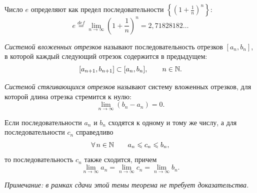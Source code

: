 \begin{definition}
Число \(e\) определяют как предел последовательности
\(\left\{\left(1 + \frac{1}{n}\right)^{n}\right\}\):
\[
e \overset{def}{=} \lim\limits_{n \to \infty}
\left(1 + \frac{1}{n}\right)^{n} = 2{,}71828182\ldots\]
\end{definition}


\begin{definition}
\textit{Системой вложенных отрезков} называют последовательность отрезков
\([a_{n}, b_{n}]\), в которой каждый следующий отрезок содержится в предыдущем:
\[
[a_{n+1}, b_{n+1}] \subset [a_{n}, b_{n}], \qquad n \in \mathbb{N}.
\]
\end{definition}

\begin{definition}
\textit{Системой стягивающихся отрезков} называют систему вложенных отрезков,
для которой длина отрезка стремится к нулю:
\[
\lim_{n\to\infty} (b_{n} - a_{n}) = 0.
\]
\end{definition}

\begin{theorem}
Если последовательности \(a_{n}\) и \(b_{n}\) сходятся к одному и тому же числу,
а для последовательности \(c_{n}\) справедливо
\[
\forall \, n \in \mathbb{N} \qquad a_{n} \leqslant c_{n} \leqslant b_{n},
\]
то последовательность \(c_{n}\) также сходится, причем
\[
\lim_{ n \to \infty } a_{n} = \lim_{ n \to \infty } c_{n} = \lim_{ n \to \infty } b_{n}.
\]
\end{theorem}

\textit{Примечание: в рамках сдачи этой темы теорема не требует доказательства.}

\vspace{2mm}

